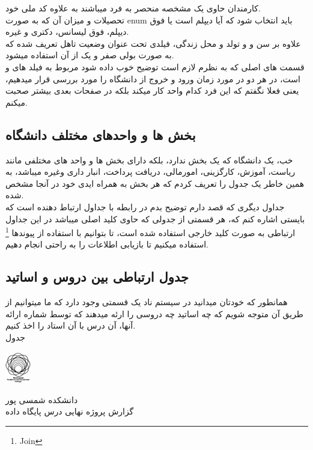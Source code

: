 \documentclass{article}
\begin{document}
کارمندان حاوی یک مشخصه منحصر به فرد میباشند به علاوه کد ملی خود.\\
تحصیلات و میزان آن که به صورت enum
باید انتخاب شود که آیا دیپلم است یا فوق دیپلم، فوق لیسانس، دکتری و غیره.\\
علاوه بر سن و و تولد و محل زندگی، فیلدی تحت عنوان وضعیت تاهل تعریف شده که به صورت بولی صفر و یک از آن استفاده میشود.\\

قسمت های اصلی که به نظرم لازم است توضیح خوب داده شود مربوط به فیلد های 
و
است، در هر دو در مورد زمان ورود و خروج از دانشگاه را مورد بررسی قرار میدهیم،
یعنی فعلا نگفتم که این فرد کدام واحد کار میکند بلکه در صفحات بعدی بیشتر صحبت میکنم.


\subsection{بخش ها و واحدهای مختلف دانشگاه}
خب، یک دانشگاه که یک بخش ندارد، بلکه دارای بخش ها و واحد های مختلفی مانند 
ریاست، آموزش، کارگزینی، امورمالی، دریافت پرداخت، انبار داری وغیره میباشد، به همین خاطر
یک جدول را تعریف کردم که هر بخش به همراه ایدی خود در آنجا مشخص شده.\\

 جداول دیگری که قصد دارم توضیح بدم در رابطه با جداول ارتباط دهنده است که بایستی اشاره کنم که، 
 هر قسمتی از جدولی که حاوی کلید اصلی میباشد در این جداول ارتباطی به صورت کلید خارجی استفاده شده است، تا بتوانیم با استفاده از 
 پیوندها
 \footnote{Join}
 استفاده میکنیم تا بازیابی اطلاعات را به راحتی انجام دهیم.

\subsection{جدول ارتباطی بین دروس و اساتید}
همانطور که خودتان میدانید در سیستم ناد یک قسمتی وجود دارد که ما
میتوانیم از طریق آن متوجه شویم که چه اساتید چه دروسی را ارئه میدهند که توسط
شماره ارائه آنها، آن درس با آن استاد را اخذ کنیم.\\
جدول 

\begin{minipage}{0.1\textwidth}%
  \includegraphics[width=1.1cm]{tvu.png}
  \end{minipage}%
  \hfill%
  \begin{minipage}{0.9\textwidth}\raggedleft
  دانشکده شمسی پور\\
  گزارش پروژه نهایی درس پایگاه داده\\
  \end{minipage}
\end{document}
